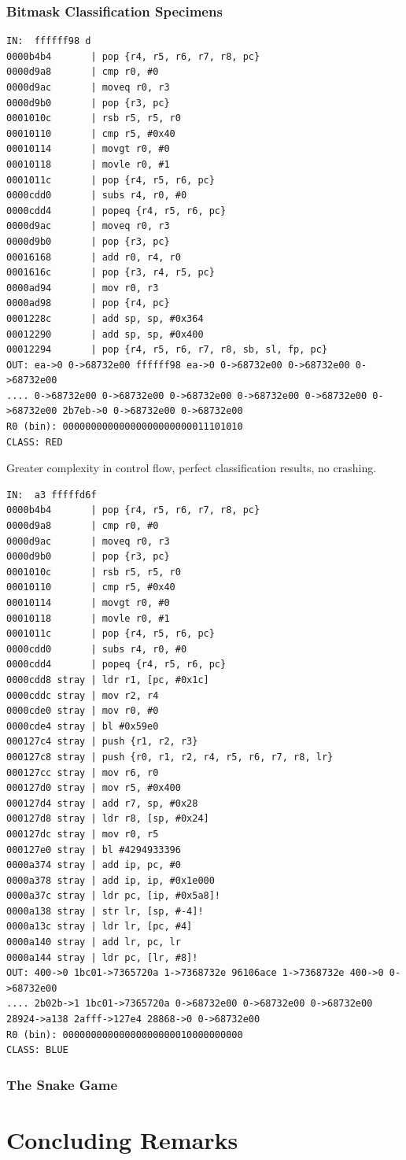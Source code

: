 \documentclass[11pt]{article}
\begin{document}
\subsubsection*{Bitmask Classification Specimens}
\label{sec:orgce98f5d}
\begin{verbatim}
IN:  ffffff98 d
0000b4b4       | pop {r4, r5, r6, r7, r8, pc}
0000d9a8       | cmp r0, #0
0000d9ac       | moveq r0, r3
0000d9b0       | pop {r3, pc}
0001010c       | rsb r5, r5, r0
00010110       | cmp r5, #0x40
00010114       | movgt r0, #0
00010118       | movle r0, #1
0001011c       | pop {r4, r5, r6, pc}
0000cdd0       | subs r4, r0, #0
0000cdd4       | popeq {r4, r5, r6, pc}
0000d9ac       | moveq r0, r3
0000d9b0       | pop {r3, pc}
00016168       | add r0, r4, r0
0001616c       | pop {r3, r4, r5, pc}
0000ad94       | mov r0, r3
0000ad98       | pop {r4, pc}
0001228c       | add sp, sp, #0x364
00012290       | add sp, sp, #0x400
00012294       | pop {r4, r5, r6, r7, r8, sb, sl, fp, pc}
OUT: ea->0 0->68732e00 ffffff98 ea->0 0->68732e00 0->68732e00 0->68732e00 
.... 0->68732e00 0->68732e00 0->68732e00 0->68732e00 0->68732e00 0->68732e00 2b7eb->0 0->68732e00 0->68732e00 
R0 (bin): 00000000000000000000000011101010
CLASS: RED
\end{verbatim}
Greater complexity in control flow, perfect classification results, no crashing.
\begin{verbatim}
IN:  a3 fffffd6f
0000b4b4       | pop {r4, r5, r6, r7, r8, pc}
0000d9a8       | cmp r0, #0
0000d9ac       | moveq r0, r3
0000d9b0       | pop {r3, pc}
0001010c       | rsb r5, r5, r0
00010110       | cmp r5, #0x40
00010114       | movgt r0, #0
00010118       | movle r0, #1
0001011c       | pop {r4, r5, r6, pc}
0000cdd0       | subs r4, r0, #0
0000cdd4       | popeq {r4, r5, r6, pc}
0000cdd8 stray | ldr r1, [pc, #0x1c]
0000cddc stray | mov r2, r4
0000cde0 stray | mov r0, #0
0000cde4 stray | bl #0x59e0
000127c4 stray | push {r1, r2, r3}
000127c8 stray | push {r0, r1, r2, r4, r5, r6, r7, r8, lr}
000127cc stray | mov r6, r0
000127d0 stray | mov r5, #0x400
000127d4 stray | add r7, sp, #0x28
000127d8 stray | ldr r8, [sp, #0x24]
000127dc stray | mov r0, r5
000127e0 stray | bl #4294933396
0000a374 stray | add ip, pc, #0
0000a378 stray | add ip, ip, #0x1e000
0000a37c stray | ldr pc, [ip, #0x5a8]!
0000a138 stray | str lr, [sp, #-4]!
0000a13c stray | ldr lr, [pc, #4]
0000a140 stray | add lr, pc, lr
0000a144 stray | ldr pc, [lr, #8]!
OUT: 400->0 1bc01->7365720a 1->7368732e 96106ace 1->7368732e 400->0 0->68732e00 
.... 2b02b->1 1bc01->7365720a 0->68732e00 0->68732e00 0->68732e00 28924->a138 2afff->127e4 28868->0 0->68732e00 
R0 (bin): 00000000000000000000010000000000
CLASS: BLUE
\end{verbatim}

\subsubsection*{The Snake Game}
\label{sec:org19e58e3}

\section*{Concluding Remarks}
\label{sec:orgb8f9945}
\end{document}
